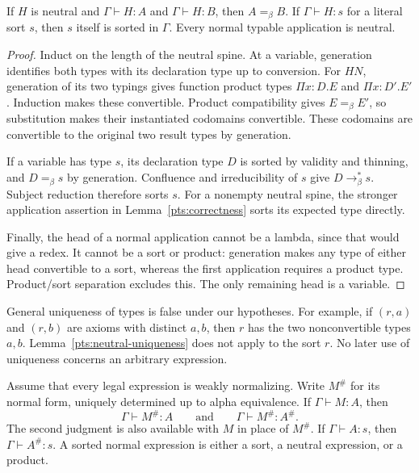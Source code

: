 \begin{lemma}\label{pts:neutral-uniqueness}
If $H$ is neutral and $\Gamma\vdash H:A$ and $\Gamma\vdash H:B$,
then $A=_\beta B$. If $\Gamma\vdash H:s$ for a literal sort $s$,
then $s$ itself is sorted in $\Gamma$. Every normal typable application
is neutral.
\end{lemma}

\begin{proof}
Induct on the length of the neutral spine. At a variable, generation
identifies both types with its declaration type up to conversion.
For $HN$, generation of its two typings gives function product types
$\Pi x:D.E$ and $\Pi x:D'.E'$. Induction makes these convertible.
Product compatibility gives $E=_\beta E'$, so substitution makes
their instantiated codomains convertible. These codomains are
convertible to the original two result types by generation.

If a variable has type $s$, its declaration type $D$ is sorted by
validity and thinning, and $D=_\beta s$ by generation. Confluence
and irreducibility of $s$ give $D\to_\beta^*s$. Subject reduction
therefore sorts $s$. For a nonempty neutral spine, the stronger
application assertion in Lemma~\ref{pts:correctness} sorts its
expected type directly.

Finally, the head of a normal application cannot be a lambda, since
that would give a redex. It cannot be a sort or product: generation
makes any type of either head convertible to a sort, whereas the
first application requires a product type. Product/sort separation
excludes this. The only remaining head is a variable.
\end{proof}

\begin{remark}\label{pts:nonfunctionality}
General uniqueness of types is false under our hypotheses. For example,
if $(r,a)$ and $(r,b)$ are axioms with distinct $a,b$, then $r$ has
the two nonconvertible types $a,b$. Lemma~\ref{pts:neutral-uniqueness}
does not apply to the sort $r$. No later use of uniqueness concerns
an arbitrary expression.
\end{remark}

\begin{lemma}\label{pts:normalizing-judgments}
Assume that every legal expression is weakly normalizing. Write
$M^\#$ for its normal form, uniquely determined up to alpha equivalence.
If $\Gamma\vdash M:A$, then
\[
                \Gamma\vdash M^\#:A
                \qquad\text{and}\qquad
                \Gamma\vdash M^\#:A^\#.
\]
The second judgment is also available with $M$ in place of $M^\#$.
If $\Gamma\vdash A:s$, then $\Gamma\vdash A^\#:s$.
A sorted normal expression is either a sort, a neutral expression,
or a product.
\end{lemma}

